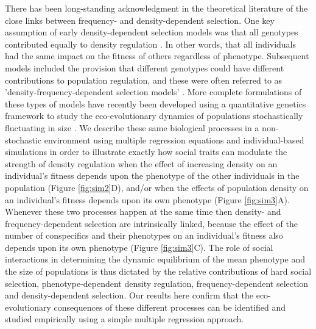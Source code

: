 \documentclass{article}
\begin{document}
There has been long-standing acknowledgment in the theoretical literature of the close links between frequency- and density-dependent selection. One key assumption of early density-dependent selection models was that all genotypes contributed equally to density regulation \citep{Joshi2001}. In other words, that all individuals had the same impact on the fitness of others regardless of phenotype. Subsequent models included the provision that different genotypes could have different contributions to population regulation, and these were often referred to as 'density-frequency-dependent selection models' \citep{Anderson1971, Matessi1976, Asmussen1983}. More complete formulations of these types of models have recently been developed using a quantitative genetics framework to study the eco-evolutionary dynamics of populations stochastically fluctuating in size \citep{Lande2007, Engen2020}. We describe these same biological processes in a non-stochastic environment using multiple regression equations and individual-based simulations in order to illustrate exactly how social traits can modulate the strength of density regulation when the effect of increasing density on an individual's fitness depends upon the phenotype of the other individuals in the population (Figure \ref{fig:sim2}D), and/or when the effects of population density on an individual's fitness depends upon its own phenotype (Figure \ref{fig:sim3}A). Whenever these two processes happen at the same time then density- and frequency-dependent selection are intrinsically linked, because the effect of the number of conspecifics and their phenotypes on an individual's fitness also depends upon its own phenotype (Figure \ref{fig:sim3}C). The role of social interactions in determining the dynamic equilibrium of the mean phenotype and the size of populations is thus dictated by the relative contributions of hard social selection, phenotype-dependent density regulation, frequency-dependent selection and density-dependent selection. Our results here confirm that the eco-evolutionary consequences of these different processes can be identified and studied empirically using a simple multiple regression approach. 
\end{document}
